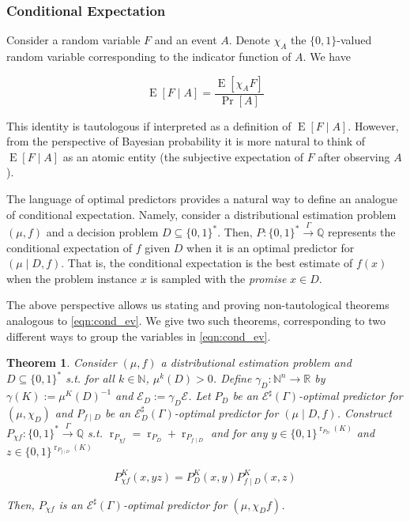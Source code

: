 \documentclass{article}
\numberwithin{equation}{section}
\theoremstyle{definition}
\theoremstyle{plain}
\newtheorem{theorem}{Theorem}[section]
\newcommand{\Bool}{\{0,1\}}
\newcommand{\Words}{{\Bool^*}}
\DeclareMathOperator{\Prb}{Pr}
\DeclareMathOperator{\E}{E}
\DeclareMathOperator{\R}{r}
\newcommand{\Nats}{\mathbb{N}}
\newcommand{\Rats}{\mathbb{Q}}
\newcommand{\Reals}{\mathbb{R}}
\newcommand{\Fall}{\mathcal{E}}
\newcommand{\ESG}{\Fall^\sharp(\Gamma)}
\newcommand{\BoolR}[1]{\Bool^{\R_{#1}(K)}}
\newcommand{\Scheme}{\xrightarrow{\Gamma}}
\begin{document}
\subsubsection{Conditional Expectation}

Consider a random variable $F$ and an event $A$. Denote $\chi_A$ the $\Bool$-valued random variable corresponding to the indicator function of $A$. We have

\begin{equation}
\label{eqn:cond_ev}
\E[F \mid A] = \frac{\E[\chi_A F]}{\Prb[A]}
\end{equation}

This identity is tautologous if interpreted as a definition of $\E[F \mid A]$. However, from the perspective of Bayesian probability it is more natural to think of $\E[F \mid A]$ as an atomic entity (the subjective expectation of $F$ after observing $A$). 

The language of optimal predictors provides a natural way to define an analogue of conditional expectation. Namely, consider a distributional estimation problem $(\mu, f)$ and a decision problem ${D \subseteq \Words}$. Then, $P: \Words \Scheme \Rats$ represents the conditional expectation of $f$ given $D$ when it is an optimal predictor for $(\mu \mid D, f)$. That is, the conditional expectation is the best estimate of $f(x)$ when the problem instance $x$ is sampled with the \emph{promise} $x \in D$.

The above perspective allows us stating and proving non-tautological theorems analogous to \ref{eqn:cond_ev}. We give two such theorems, corresponding to two different ways to group the variables in \ref{eqn:cond_ev}.

\begin{samepage}
\begin{theorem}

Consider $(\mu, f)$ a distributional estimation problem and ${D \subseteq \Words}$ s.t. for all $k \in \Nats$, $\mu^k(D) > 0$. Define $\gamma_D: \Nats^n \rightarrow \Reals$ by $\gamma(K):=\mu^{K}(D)^{-1}$ and $\Fall_D:=\gamma_D \Fall$. Let $P_D$ be an $\ESG$-optimal predictor for $(\mu, \chi_D)$ and $P_{f \mid D}$ be an $\Fall_D^\sharp(\Gamma)$-optimal predictor for ${(\mu \mid D, f)}$. Construct ${P_{\chi f}: \Words \Scheme \Rats}$ s.t. $\R_{P_{\chi f}}=\R_{P_D} + \R_{P_{f \mid D}}$ and for any $y \in \BoolR{P_D}$ and ${z \in \BoolR{P_{f \mid D}}}$

\begin{equation}
P_{\chi f}^K(x,yz)=P_D^K(x,y) P_{f \mid D}^K(x,z)
\end{equation}

Then, $P_{\chi f}$ is an $\ESG$-optimal predictor for $(\mu, \chi_Df)$.

\end{theorem}
\end{samepage}
\end{document}
